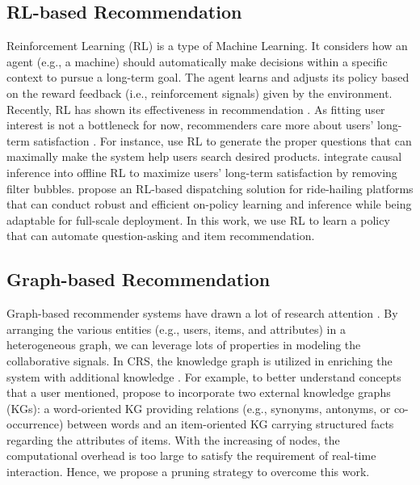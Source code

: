 \subsection{RL-based Recommendation} Reinforcement Learning (RL) is a type of Machine Learning. It considers how an agent (e.g., a machine) should automatically make decisions within a specific context to pursue a long-term goal. The agent learns and adjusts its policy based on the reward feedback (i.e., reinforcement signals) given by the environment. Recently, RL has shown its effectiveness in recommendation \cite{afsar2022reinforcement,deffayet2023offline,gao2023alleviating}. As fitting user interest is not a bottleneck for now, recommenders care more about users' long-term satisfaction \cite{ResAct,10.1145/3534678.3539040,wang2022best}. For instance, \citet{10.1145/3488560.3498526} use RL to generate the proper questions that can maximally make the system help users search desired products. \citet{gao2022cirs} integrate causal inference into offline RL to maximize users' long-term satisfaction by removing filter bubbles. \citet{10.1145/3534678.3539095} propose an RL-based dispatching solution for ride-hailing platforms that can conduct robust and efficient on-policy learning and inference while being adaptable for full-scale deployment. In this work, we use RL to learn a policy that can automate question-asking and item recommendation.


\subsection{Graph-based Recommendation} Graph-based recommender systems have drawn a lot of research attention \cite{10.1145/3534678.3539452,10.1145/3534678.3539458,10.1145/3447548.3467384,10.1145/3447548.3467384}. By arranging the various entities (e.g., users, items, and attributes) in a heterogeneous graph, we can leverage lots of properties in modeling the collaborative signals. In CRS, the knowledge graph is utilized in enriching the system with additional knowledge \cite{lei2020interactive,xu2020user,zhou2020improving,moon-2019-opendialkg,zhou2020interactive}. For example, to better understand concepts that a user mentioned, \citet{zhou2020improving} propose to incorporate two external knowledge graphs (KGs): a word-oriented KG providing relations (e.g., synonyms, antonyms, or co-occurrence) between words and an item-oriented KG carrying structured facts regarding the attributes of items. With the increasing of nodes, the computational overhead is too large to satisfy the requirement of real-time interaction. Hence, we propose a pruning strategy to overcome this work.